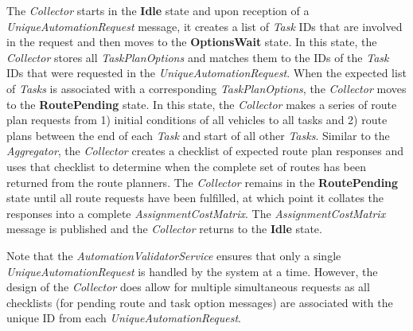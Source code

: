 The \emph{Collector} starts in the \textbf{Idle} state and upon
reception of a \emph{UniqueAutomationRequest} message, it creates a list
of \emph{Task} IDs that are involved in the request and then moves to
the \textbf{OptionsWait} state. In this state, the \emph{Collector}
stores all \emph{TaskPlanOptions} and matches them to the IDs of the
\emph{Task} IDs that were requested in the
\emph{UniqueAutomationRequest}. When the expected list of \emph{Tasks}
is associated with a corresponding \emph{TaskPlanOptions}, the
\emph{Collector} moves to the \textbf{RoutePending} state. In this
state, the \emph{Collector} makes a series of route plan requests from
1) initial conditions of all vehicles to all tasks and 2) route plans
between the end of each \emph{Task} and start of all other \emph{Tasks}.
Similar to the \emph{Aggregator}, the \emph{Collector} creates a
checklist of expected route plan responses and uses that checklist to
determine when the complete set of routes has been returned from the
route planners. The \emph{Collector} remains in the
\textbf{RoutePending} state until all route requests have been
fulfilled, at which point it collates the responses into a complete
\emph{AssignmentCostMatrix}. The \emph{AssignmentCostMatrix} message is
published and the \emph{Collector} returns to the \textbf{Idle} state.

Note that the \emph{AutomationValidatorService} ensures that only a
single \emph{UniqueAutomationRequest} is handled by the system at a
time. However, the design of the \emph{Collector} does allow for
multiple simultaneous requests as all checklists (for pending route and
task option messages) are associated with the unique ID from each
\emph{UniqueAutomationRequest}.

